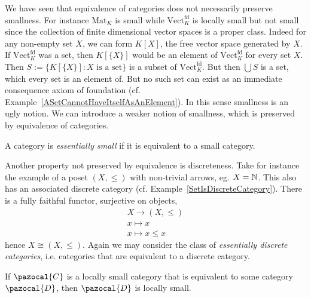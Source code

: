     We have seen that equivalence of categories does not necessarily preserve smallness. For instance $\mathrm{Mat}_K$ is small while $\mathrm{Vect}_K^\mathrm{fd}$ is locally small but not small since the collection of finite dimensional vector spaces is a proper class. Indeed for any non-empty set $X$, we can form $K[X]$, the free vector space generated by $X$. If $\mathrm{Vect}_K^\mathrm{fd}$ was a set, then $K[\{X\}]$ would be an element of $\mathrm{Vect}_K^\mathrm{fd}$ for every set $X$. Then $S:=\{K[\{X\}] : X \text{ is a set}\}$ is a subset of $\mathrm{Vect}_K^\mathrm{fd}$. But then $ \bigcup S$ is a set, which every set is an element of. But no such set can exist as an immediate consequence axiom of foundation (cf. Example~\ref{ASetCannotHaveItselfAsAnElement}). In this sense smallness is an ugly notion. We can introduce a weaker notion of smallness, which is preserved by equivalence of categories. 
    \begin{definition}
        A category is \emph{essentially small} if it is equivalent to a small category.
    \end{definition}
    Another property not preserved by equivalence is discreteness. Take for instance the example of a poset $(X,\leq)$ with non-trivial arrows, eg. $X=\mathbb{N}$. This also has an associated discrete category (cf. Example~\ref{SetIsDiscreteCategory}). There is a fully faithful functor, surjective on objects, 
    \begin{gather*}
        X\rightarrow (X,\leq)\\
        x\mapsto x\\
        x\mapsto x\leq x
    \end{gather*}
    hence $X\cong (X,\leq)$. Again we may consider the class of \emph{essentially discrete categories}, i.e. categories that are equivalent to a discrete category.
    \begin{proposition}
        If $\pazocal{C}$ is a locally small category that is equivalent to some category $\pazocal{D}$, then $\pazocal{D}$ is locally small. 
    \end{proposition}
